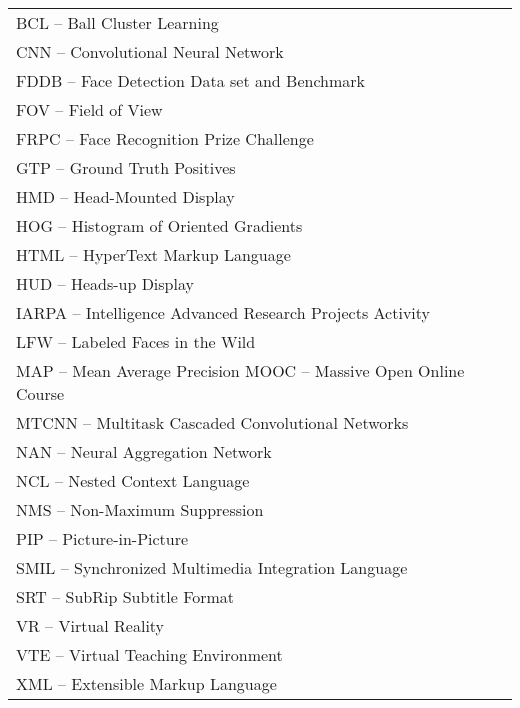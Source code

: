 
\begin{thenotations}
\renewcommand{\arraystretch}{1.5}
  \noindent
  \begin{tabular}{ll}

BCL -- Ball Cluster Learning\\
CNN -- Convolutional Neural Network\\
FDDB -- Face Detection Data set and Benchmark\\
FOV -- Field of View\\
FRPC -- Face Recognition Prize Challenge\\
GTP -- Ground Truth Positives\\
HMD -- Head-Mounted Display\\
HOG -- Histogram of Oriented Gradients\\
HTML -- HyperText Markup Language\\
HUD -- Heads-up Display\\
IARPA -- Intelligence Advanced Research Projects Activity\\
LFW -- Labeled Faces in the Wild\\
MAP -- Mean Average Precision
MOOC -- Massive Open Online Course\\
MTCNN -- Multitask Cascaded Convolutional Networks\\
NAN -- Neural Aggregation Network\\
NCL -- Nested Context Language\\
NMS -- Non-Maximum Suppression\\
PIP -- Picture-in-Picture\\
SMIL -- Synchronized Multimedia Integration Language\\
SRT -- SubRip Subtitle Format\\
VR -- Virtual Reality\\
VTE -- Virtual Teaching Environment\\
XML -- Extensible Markup Language\\

  \end{tabular}

\end{thenotations}